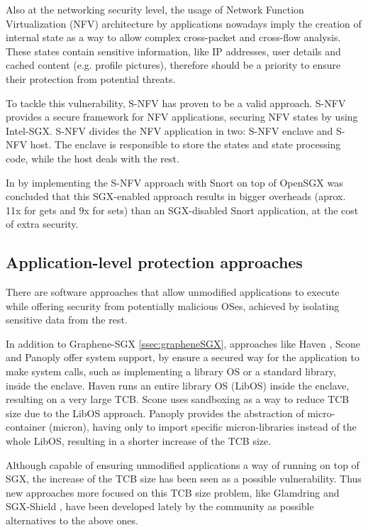 Also at the networking security level, the usage of Network Function Virtualization (NFV) architecture by applications nowadays imply the creation of internal state as a way to allow complex cross-packet and cross-flow analysis. These states contain sensitive information, like IP addresses, user details and cached content (e.g. profile pictures), therefore should be a priority to ensure their protection from potential threats. 

To tackle this vulnerability, S-NFV has proven to be a valid approach. 
S-NFV provides a secure framework for NFV applications, securing NFV states by using Intel-SGX. S-NFV divides the NFV application in two: S-NFV enclave and S-NFV host. The enclave is responsible to store the states and state processing code, while the host deals with the rest.

In \cite{sNFVPaper} by implementing the S-NFV approach with Snort \cite{snortPaper} on top of OpenSGX was concluded that this SGX-enabled approach results in bigger overheads (aprox. 11x for gets and 9x for sets) than an SGX-disabled Snort application, at the cost of extra security.



\subsection{Application-level protection approaches}
\label{ssec:sgx_applvl_frameworks}

There are software approaches that allow unmodified applications to execute while offering security from potentially malicious OSes, achieved by isolating sensitive data from the rest. 

In addition to Graphene-SGX \ref{ssec:grapheneSGX}, approaches like Haven \cite{havenPaper}, Scone \cite{sconePaper} and Panoply \cite{panoplyPaper} offer system support, by ensure a secured way for the application to make system calls, such as implementing a library OS or a standard library, inside the enclave. 
Haven runs an entire library OS (LibOS) inside the enclave, resulting on a very large TCB. 
Scone uses sandboxing as a way to reduce TCB size due to the LibOS approach.
Panoply provides the abstraction of micro-container (micron), having only to import specific micron-libraries instead of the whole LibOS, resulting in a shorter increase of the TCB size. 

Although capable of ensuring unmodified applications a way of running on top of SGX, the increase of the TCB size has been seen as a possible vulnerability. 
Thus new approaches more focused on this TCB size problem, like Glamdring \cite{glamdringPaper} and SGX-Shield \cite{sgxShieldPaper}, have been developed lately by the community as possible alternatives to the above ones.




